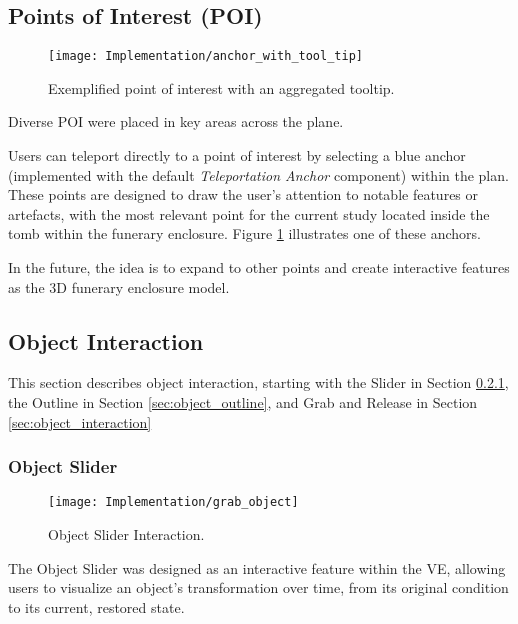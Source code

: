 \subsection{Points of Interest (\gls{POI})}
\label{sec:points_interest}

\begin{figure}[h!]
    \centering
    \texttt{[image: Implementation/anchor\_with\_tool\_tip]}
    \caption{Exemplified point of interest with an aggregated tooltip.}
    \label{fig:points_interest}
\end{figure}

Diverse \gls{POI} were placed in key areas across the plane.

Users can teleport directly to a point of interest by selecting a blue anchor (implemented with the default \emph{Teleportation Anchor} component) within the plan. These points are designed to draw the user’s attention to notable features or artefacts, with the most relevant point for the current study located inside the tomb within the funerary enclosure.
Figure \ref{fig:points_interest} illustrates one of these anchors.

In the future, the idea is to expand to other points and create interactive features as the \gls{3D} funerary enclosure model. 

\subsection{Object Interaction}
\label{sec:object_interact}
This section describes object interaction, starting with the Slider in Section \ref{sec:object_slider}, the Outline in Section \ref{sec:object_outline}, and Grab and Release in Section \ref{sec:object_interaction}

\subsubsection{Object Slider}
\label{sec:object_slider}

 \begin{figure}[h!]
    \centering
    \texttt{[image: Implementation/grab\_object]}
    \caption{Object Slider Interaction.}
    \label{fig:object_slider}
\end{figure}

The Object Slider was designed as an interactive feature within the \gls{VE}, allowing users to visualize an object's transformation over time, from its original condition to its current, restored state. 

